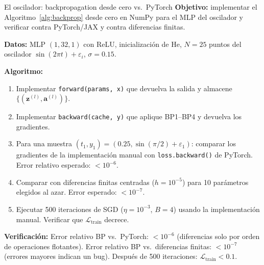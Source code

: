 \begin{ejerciciocomp}{El oscilador: backpropagation desde cero vs.\ PyTorch}
\label{ejcomp:oscilador6}
\textbf{Objetivo:} implementar el Algoritmo~\ref{alg:backprop} desde cero
en NumPy para el MLP del oscilador y verificar contra PyTorch/JAX y contra
diferencias finitas.

\medskip\noindent\textbf{Datos:}
MLP $(1, 32, 1)$ con ReLU, inicialización de He, $N = 25$ puntos del
oscilador $\sin(2\pi t) + \varepsilon_i$, $\sigma = 0.15$.

\medskip\noindent\textbf{Algoritmo:}
\begin{enumerate}
  \item Implementar \texttt{forward(params, x)} que devuelva la salida y
        almacene $\{(\bm{z}^{(l)}, \bm{a}^{(l)})\}$.
  \item Implementar \texttt{backward(cache, y)} que aplique BP1–BP4 y
        devuelva los gradientes.
  \item Para una muestra $(t_1, y_1) = (0.25, \sin(\pi/2)+\varepsilon_1)$:
        comparar los gradientes de la implementación manual con
        \texttt{loss.backward()} de PyTorch. Error relativo esperado:
        $< 10^{-6}$.
  \item Comparar con diferencias finitas centradas ($h = 10^{-5}$) para
        10 parámetros elegidos al azar. Error esperado: $< 10^{-7}$.
  \item Ejecutar 500 iteraciones de SGD ($\eta = 10^{-3}$, $B = 4$) usando
        la implementación manual. Verificar que
        $\mathcal{L}_{\text{train}}$ decrece.
\end{enumerate}

\medskip\noindent\textbf{Verificación:}
Error relativo BP vs.\ PyTorch: $< 10^{-6}$ (diferencias solo por orden
de operaciones flotantes).
Error relativo BP vs.\ diferencias finitas: $< 10^{-7}$ (errores mayores
indican un bug).
Después de 500 iteraciones: $\mathcal{L}_{\text{train}} < 0.1$.
\end{ejerciciocomp}

